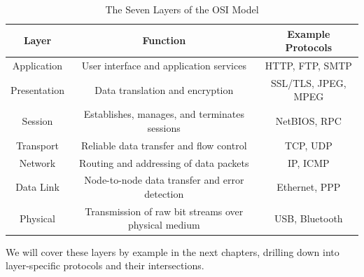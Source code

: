 \begin{table}[h]
    \centering
    \begin{tabular}{|c|c|c|}
        \hline
        \textbf{Layer} & \textbf{Function} & \textbf{Example Protocols} \\
        \hline
        Application & User interface and application services & HTTP, FTP, SMTP \\
        Presentation & Data translation and encryption & SSL/TLS, JPEG, MPEG \\
        Session & Establishes, manages, and terminates sessions & NetBIOS, RPC \\
        Transport & Reliable data transfer and flow control & TCP, UDP \\
        Network & Routing and addressing of data packets & IP, ICMP \\
        Data Link & Node-to-node data transfer and error detection & Ethernet, PPP \\
        Physical & Transmission of raw bit streams over physical medium & USB, Bluetooth \\
        \hline
    \end{tabular}
    \caption{The Seven Layers of the OSI Model}
    \label{tab:osi_layers}
\end{table}

We will cover these layers by example in the next chapters, drilling down into layer-specific protocols and their intersections.
